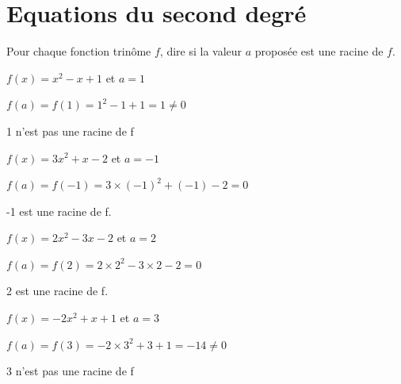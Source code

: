\documentclass[11pt,a4paper]{article}  %
\begin{document}
	\graphicspath{{./images/}}
	
	\begin{center}
		
		
	\end{center}

\section*{Equations du second degré}

\exercice{}

Pour chaque fonction trinôme $f$, dire si la valeur $a$ proposée est une racine de $f$.
\begin{enumMet}
	\item $f(x)=x^2-x+1$ et $a=1$
	\begin{corrBox}
		$f(a)=f(1)=1^2-1+1=1\neq0$
		
		1 n'est pas une racine de f		
	\end{corrBox}
	\item $f(x)=3 x^2+x-2$ et $a=-1$
	\begin{corrBox}
		$f(a)=f(-1)=3\times (-1)^2+(-1)-2=0$
		
		-1 est une racine de f.		
	\end{corrBox}
	\item $f(x)=2 x^2-3 x-2$ et $a=2$
	\begin{corrBox}
		$f(a)=f(2)=2\times 2^2-3\times 2-2=0$
		
		2 est une racine de f.		
	\end{corrBox}
	\item $f(x)=-2 x^2+x+1$ et $a=3$
	\begin{corrBox}
		$f(a)=f(3)=-2\times 3^2+3+1=-14\neq0$
		
		3 n'est pas une racine de f		
	\end{corrBox}
\end{enumMet}

\exercice{}
\end{document}
